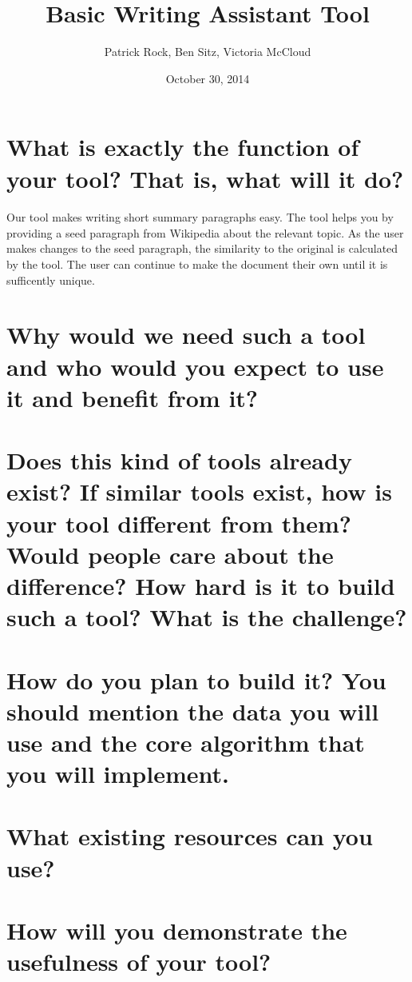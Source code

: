 \documentclass{article}
\title{Basic Writing Assistant Tool}
\author{Patrick Rock, Ben Sitz, Victoria McCloud}
\date{October 30, 2014}
\begin{document}
\maketitle

\section{What is exactly the function of your tool? That is, what will it do?}
\paragraph{}
Our tool makes writing short summary paragraphs easy. The tool helps you by providing a seed paragraph from Wikipedia about the relevant topic.
As the user makes changes to the seed paragraph, the similarity to the original is calculated by the tool. The user can continue to make the 
document their own until it is sufficently unique.

\section{Why would we need such a tool and who would you expect to use it and benefit from it?}


\section{Does this kind of tools already exist? If similar tools exist, how is your tool different from them? Would people care about the difference? How hard is it to build such a tool? What is the challenge?}

\section{How do you plan to build it? You should mention the data you will use and the core algorithm that you will implement.}

\section{What existing resources can you use?}

\section{How will you demonstrate the usefulness of your tool?}
\end{document}

